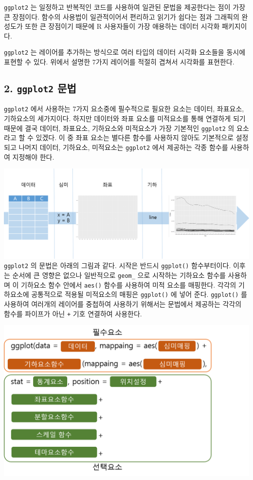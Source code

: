 \documentclass[
]{article}
\begin{document}
\texttt{ggplot2} 는 일정하고 반복적인 코드를 사용하여 일관된 문법을 제공한다는 점이 가장 큰 장점이다. 함수의 사용법이 일관적이어서 편리하고 읽기가 쉽다는 점과 그래픽의 완성도가 또한 큰 장점이기 때문에 R 사용자들이 가장 애용하는 데이터 시각화 패키지이다.

\texttt{ggplot2} 는 레이어를 추가하는 방식으로 여러 타입의 데이터 시각화 요소들을 동시에 표현할 수 있다. 위에서 설명한 7가지 레이어를 적절히 겹쳐서 시각화를 표현한다.

\hypertarget{ggplot2-uxbb38uxbc95}{%
\subsection{\texorpdfstring{2. \texttt{ggplot2} 문법}{2. ggplot2 문법}}\label{ggplot2-uxbb38uxbc95}}

\texttt{ggplot2} 에서 사용하는 7가지 요소중에 필수적으로 필요한 요소는 데이터, 좌표요소, 기하요소의 세가지이다. 하지만 데이터와 좌표 요소를 미적요소를 통해 연결하게 되기 때문에 결국 데이터, 좌표요소, 기하요소와 미적요소가 가장 기본적인 \texttt{ggplot2} 의 요소라고 할 수 있겠다. 이 중 좌표 요소는 별다른 함수를 사용하지 않아도 기본적으로 설정되고 나머지 데이터, 기하요소, 미적요소는 \texttt{ggplot2} 에서 제공하는 각종 함수를 사용하여 지정해야 한다.

\includegraphics{그림1.png}\\
\texttt{ggplot2} 의 문법은 아래의 그림과 같다. 시작은 반드시 \texttt{ggplot()} 함수부터이다. 이후는 순서에 큰 영향은 없으나 일반적으로 \texttt{geom\_} 으로 시작하는 기하요소 함수를 사용하며 이 기하요소 함수 안에서 \texttt{aes()} 함수를 사용하여 미적 요소를 매핑한다. 각각의 기하요소에 공통적으로 적용될 미적요소의 매핑은 \texttt{ggplot()} 에 넣어 준다. \texttt{ggplot()} 를 사용하여 여러개의 레이어를 중첩하여 사용하기 위해서는 문법에서 제공하는 각각의 함수를 파이프가 아닌 \texttt{+} 기호 연결하여 사용한다.

\includegraphics{그림2.png}
\end{document}
